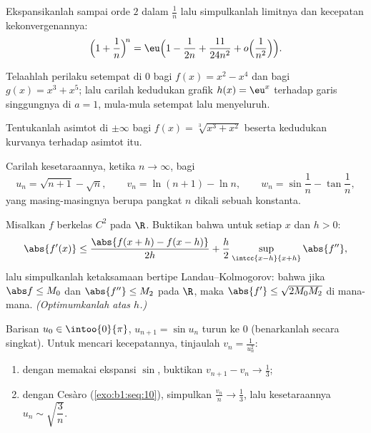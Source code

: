 \begin{exercise}[$\star\star$]\label{exo:b1:taylor:5}
Ekspansikanlah sampai orde $2$ dalam $\frac1n$ lalu simpulkanlah limitnya dan
kecepatan kekonvergenannya:
\[
\Bigl(1 + \frac 1n\Bigr)^{\!n}
= \eu\Bigl(1 - \frac{1}{2n} + \frac{11}{24n^2} +
o\Bigl(\frac{1}{n^2}\Bigr)\Bigr).
\]
\end{exercise}

\begin{exercise}[$\star\star$]\label{exo:b1:taylor:6}
Telaahlah perilaku setempat di $0$ bagi $f(x) = x^2 - x^4$ dan bagi $g(x) =
x^3 + x^5$; lalu carilah kedudukan grafik $h(x) = \eu^x$
terhadap garis singgungnya di $a = 1$, mula-mula setempat lalu menyeluruh.
\end{exercise}

\begin{exercise}[$\star\star$]\label{exo:b1:taylor:7}
Tentukanlah asimtot di $\pm\infty$ bagi $f(x) =
\sqrt[3]{x^3 + x^2}$ beserta kedudukan kurvanya terhadap
asimtot itu.
\end{exercise}

\begin{exercise}[$\star\star$]\label{exo:b1:taylor:8}
Carilah kesetaraannya, ketika $n \to \infty$, bagi
\[
u_n = \sqrt{n+1} - \sqrt n, \qquad
v_n = \ln(n+1) - \ln n, \qquad
w_n = \sin\frac{1}{n} - \tan\frac{1}{n},
\]
yang masing-masingnya berupa pangkat $n$ dikali sebuah konstanta.
\end{exercise}

\begin{exercise}[$\star\star\star$]\label{exo:b1:taylor:9}
Misalkan $f$ berkelas $C^2$ pada $\R$. Buktikan bahwa untuk setiap $x$ dan $h > 0$:
\[
\abs{f'(x)} \leq \frac{\abs{f(x+h) - f(x-h)}}{2h} +
\frac{h}{2}\sup_{\intcc{x-h}{x+h}}\abs{f''} ,
\]
lalu simpulkanlah ketaksamaan bertipe Landau--Kolmogorov: bahwa jika $\abs f \leq
M_0$ dan $\abs{f''} \leq M_2$ pada $\R$, maka $\abs{f'} \leq
\sqrt{2 M_0 M_2}$ di mana-mana. \emph{(Optimumkanlah atas $h$.)}
\end{exercise}

\begin{exercise}[$\star\star\star$]\label{exo:b1:taylor:10}
Barisan $u_0 \in \intoo{0}{\pi}$, $u_{n+1} = \sin u_n$
turun ke $0$ (benarkanlah secara singkat). Untuk mencari kecepatannya, tinjaulah $v_n
= \frac{1}{u_n^2}$:
\begin{enumerate}
  \item dengan memakai ekspansi $\sin$, buktikan $v_{n+1} - v_n \to
        \frac13$;
  \item dengan Cesàro (\cref{exo:b1:seq:10}), simpulkan $\frac{v_n}{n}
        \to \frac13$, lalu kesetaraannya $u_n \sim
        \sqrt{\dfrac{3}{n}}$.
\end{enumerate}
\end{exercise}

